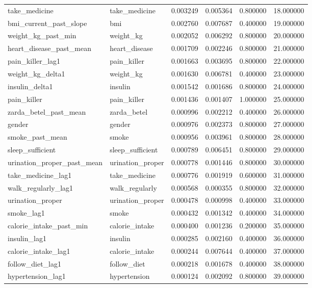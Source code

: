 \begin{longtable}{llrrrr}
take\_medicine & take\_medicine & 0.003249 & 0.005364 & 0.800000 & 18.000000 \\
bmi\_current\_past\_slope & bmi & 0.002760 & 0.007687 & 0.400000 & 19.000000 \\
weight\_kg\_past\_min & weight\_kg & 0.002052 & 0.006292 & 0.800000 & 20.000000 \\
heart\_disease\_past\_mean & heart\_disease & 0.001709 & 0.002246 & 0.800000 & 21.000000 \\
pain\_killer\_lag1 & pain\_killer & 0.001663 & 0.003695 & 0.800000 & 22.000000 \\
weight\_kg\_delta1 & weight\_kg & 0.001630 & 0.006781 & 0.400000 & 23.000000 \\
insulin\_delta1 & insulin & 0.001542 & 0.001686 & 0.800000 & 24.000000 \\
pain\_killer & pain\_killer & 0.001436 & 0.001407 & 1.000000 & 25.000000 \\
zarda\_betel\_past\_mean & zarda\_betel & 0.000996 & 0.002212 & 0.400000 & 26.000000 \\
gender & gender & 0.000976 & 0.002373 & 0.800000 & 27.000000 \\
smoke\_past\_mean & smoke & 0.000956 & 0.003961 & 0.800000 & 28.000000 \\
sleep\_sufficient & sleep\_sufficient & 0.000789 & 0.006451 & 0.800000 & 29.000000 \\
urination\_proper\_past\_mean & urination\_proper & 0.000778 & 0.001446 & 0.800000 & 30.000000 \\
take\_medicine\_lag1 & take\_medicine & 0.000776 & 0.001919 & 0.600000 & 31.000000 \\
walk\_regularly\_lag1 & walk\_regularly & 0.000568 & 0.000355 & 0.800000 & 32.000000 \\
urination\_proper & urination\_proper & 0.000478 & 0.000998 & 0.400000 & 33.000000 \\
smoke\_lag1 & smoke & 0.000432 & 0.001342 & 0.400000 & 34.000000 \\
calorie\_intake\_past\_min & calorie\_intake & 0.000400 & 0.001236 & 0.200000 & 35.000000 \\
insulin\_lag1 & insulin & 0.000285 & 0.002160 & 0.400000 & 36.000000 \\
calorie\_intake\_lag1 & calorie\_intake & 0.000244 & 0.007644 & 0.400000 & 37.000000 \\
follow\_diet\_lag1 & follow\_diet & 0.000218 & 0.001678 & 0.400000 & 38.000000 \\
hypertension\_lag1 & hypertension & 0.000124 & 0.002092 & 0.800000 & 39.000000 \\

\end{longtable}

